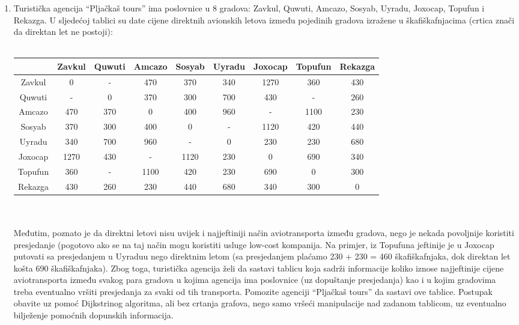 \documentclass[12pt]{article}
\begin{document}
\begin{enumerate}
\begin{center}
\end{center}
\newpage
\vspace{0.75cm}
	\item Turistička agencija “Pljačkaš tours” ima poslovnice u 8 gradova: Zavkul, Quwuti, Amcazo, Sosyab, Uyradu, Joxocap, Topufun i Rekazga. U sljedećoj tablici su date cijene direktnih avionskih letova između pojedinih gradova izražene u škafiškafnjacima (crtica znači da direktan let ne postoji):\\
	\vspace{0.3cm}\\
\begin{tabular}{|c|c|c|c|c|c|c|c|c|}
\hline
 & Zavkul & Quwuti & Amcazo & Sosyab & Uyradu & Joxocap & Topufun & Rekazga \\ \hline
Zavkul & 0 & - & 470 & 370 & 340 & 1270 & 360 & 430 \\ \hline
Quwuti & - & 0 & 370 & 300 & 700 & 430 & - & 260 \\ \hline
Amcazo & 470 & 370 & 0 & 400 & 960 & - & 1100 & 230 \\ \hline
Sosyab & 370 & 300 & 400 & 0 & - & 1120 & 420 & 440 \\ \hline
Uyradu & 340 & 700 & 960 & - & 0 & 230 & 230 & 680 \\ \hline
Joxocap & 1270 & 430 & - & 1120 & 230 & 0 & 690 & 340 \\ \hline
Topufun & 360 & - & 1100 & 420 & 230 & 690 & 0 & 300 \\ \hline
Rekazga & 430 & 260 & 230 & 440 & 680 & 340 & 300 & 0 \\ \hline
\end{tabular}
\\
     \vspace{0.3cm}\\
     Međutim, poznato je da direktni letovi nisu uvijek i najjeftiniji način aviotransporta između gradova, nego je nekada povoljnije koristiti presjedanje (pogotovo ako se na taj način mogu koristiti usluge low-cost kompanija. Na primjer, iz Topufuna jeftinije je u Joxocap putovati sa presjedanjem u Uyraduu nego direktnim letom (sa presjedanjem plaćamo 230 + 230 = 460 škafiškafnjaka, dok direktan let košta 690 škafiškafnjaka). Zbog toga, turistička agencija želi da sastavi tablicu koja sadrži informacije koliko iznose najjeftinije cijene aviotransporta između svakog para gradova u kojima agencija ima poslovnice (uz dopuštanje presjedanja) kao i u kojim gradovima treba eventualno vršiti presjedanja za svaki od tih transporta. Pomozite agenciji “Pljačkaš tours” da sastavi ove tablice. Postupak obavite uz pomoć Dijkstrinog algoritma, ali bez crtanja grafova, nego samo vršeći manipulacije nad zadanom tablicom, uz eventualno bilježenje pomoćnih dopunskih informacija.

\end{enumerate}
\end{document}

